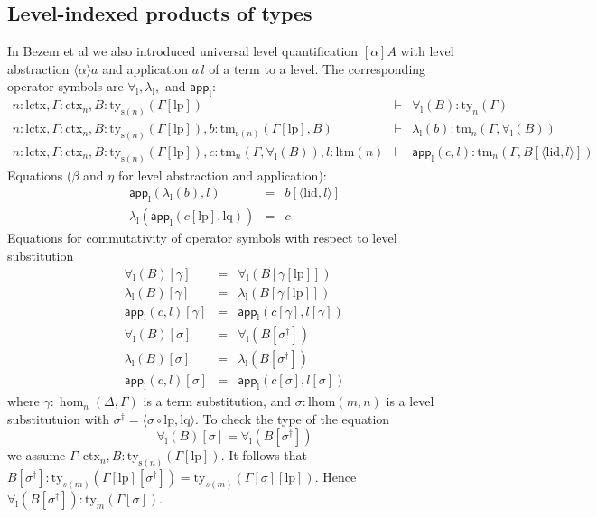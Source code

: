 \documentclass[11pt,a4paper]{article}
\theoremstyle{plain}
\theoremstyle{definition}
\newcommand{\app}[2]{{#1\,#2}} %
\def\lhom{\mathrm{lhom}}
\def\lctx{\mathrm{lctx}}
\def\ltm{\mathrm{ltm}}
\def\lp{\mathrm{lp}}
\def\lq{\mathrm{lq}}
\def\s{\mathrm{s}}
\def\lid{\mathrm{lid}}
\newcommand{\ctx}{\mathrm{ctx}}
\newcommand{\ty}{\mathrm{ty}}
\newcommand{\tm}{\mathrm{tm}}
\newcommand{\tuple}[1]{\langle #1 \rangle}
\def\app{\mathsf{app}}
\begin{document}
\subsection{Level-indexed products of types}
\def\l{\mathrm{l}}
In Bezem et al \cite{BezemCDE22} we also introduced 
universal level quantification $[\alpha]A$ with level abstraction $\tuple{\alpha}a$ and application $a\,l$ of a term to a level. The corresponding operator symbols are $\forall_\l, \lambda_\l,$ and $\app_\l$:
\begin{eqnarray*}
n : \lctx, \Gamma : \ctx_n, B : \ty_{\s(n)}(\Gamma[\lp])&\vdash& \forall_\l(B) : \ty_n(\Gamma)\\
n : \lctx, \Gamma : \ctx_n, B : \ty_{\s(n)}(\Gamma[\lp]), b : \tm_{\s(n)}(\Gamma[\lp], B) &\vdash& \lambda_\l(b) : \tm_n(\Gamma,\forall_\l(B))\\
n : \lctx, \Gamma : \ctx_n, B : \ty_{\s(n)}(\Gamma[\lp]), c :  \tm_n(\Gamma,\forall_\l(B)), l : \ltm(n) &\vdash& \app_\l(c,l) : \tm_n(\Gamma, B[\tuple{\lid,l}])
\end{eqnarray*}
Equations ($\beta$ and $\eta$ for level abstraction and application):
 \begin{eqnarray*}
 \app_\l(\lambda_\l(b),l) &=& b[\tuple{\lid,l}]\\
 \lambda_\l(\app_\l(c[\lp],\lq)) &=& c
 \end{eqnarray*}
 Equations for commutativity of operator symbols with respect to level substitution
 \begin{eqnarray*}
 \forall_\l(B)[ \gamma ] &=& \forall_\l(B[ \gamma[\lp]])\\
 \lambda_\l(B)[ \gamma ] &=& \lambda_\l(B[ \gamma[\lp]])\\
 \app_\l(c,l)[ \gamma ] &=& \app_\l(c[ \gamma ] ,l[ \gamma ] )\\
 \forall_\l(B)[ \sigma ] &=& \forall_\l(B[ \sigma^{\dagger}])\\
 \lambda_\l(B)[ \sigma ] &=& \lambda_\l(B[ \sigma^{\dagger}])\\
\app_\l(c,l)[ \sigma ] &=& \app_\l(c[ \sigma ] ,l[ \sigma ] )
\end{eqnarray*}
where $\gamma : \hom_n(\Delta,\Gamma)$ is a term substitution, and $\sigma : \lhom(m,n)$ is a level substitutuion with $\sigma^\dagger = \tuple{\sigma \circ \lp, \lq}$. 
To check the type of the equation
$$ \forall_\l(B)[ \sigma ] = \forall_\l(B[ \sigma^{\dagger}])$$ we assume $\Gamma : \ctx_n, B : \ty_{\s(n)}(\Gamma[\lp])$. It follows that $B[\sigma^\dagger] : \ty_{s(m)}(\Gamma[\lp][\sigma^\dagger]) = \ty_{s(m)}(\Gamma[\sigma][\lp])$. Hence 
$\forall_\l(B[ \sigma^{\dagger}]) : \ty_m(\Gamma[\sigma])$.
\end{document}

